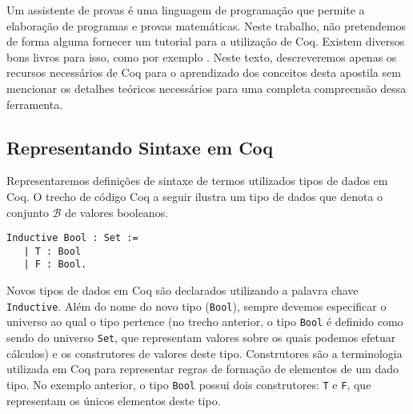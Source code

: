 Um assistente de provas \'e uma linguagem de programa\c{c}\~ao que permite a elabora\c{c}\~ao de programas e provas matem\'aticas.
Neste trabalho, n\~ao pretendemos de forma alguma fornecer um tutorial para a utiliza\c{c}\~ao de Coq. Existem diversos bons livros
para isso, como por exemplo \cite{coqart,Pierce12,Coqrefman}. Neste texto, descreveremos apenas os recursos necess\'arios de Coq para
o aprendizado dos conceitos desta apostila sem mencionar os detalhes te\'oricos necess\'arios para uma completa compreens\~ao dessa ferramenta.

\subsection{Representando Sintaxe em Coq}

Representaremos defini\c{c}\~oes de sintaxe de termos utilizados tipos de dados em Coq. O trecho de c\'odigo Coq a seguir ilustra um
tipo de dados que denota o conjunto $\mathcal{B}$ de valores booleanos.

\begin{lstlisting}
Inductive Bool : Set :=
   | T : Bool
   | F : Bool.
\end{lstlisting}

Novos tipos de dados em Coq s\~ao declarados utilizando a palavra chave \texttt{Inductive}. Al\'em do nome do novo tipo (\texttt{Bool}), sempre
devemos especificar o universo ao qual o tipo pertence (no trecho anterior, o tipo \texttt{Bool} \'e definido como sendo do universo 
\texttt{Set}, que representam valores sobre os quais podemos efetuar c\'alculos) e os construtores de valores deste tipo. Construtores s\~ao
a terminologia utilizada em Coq para representar regras de forma\c{c}\~ao de elementos de um dado tipo. No exemplo anterior, o tipo \texttt{Bool}
possui dois construtores: \texttt{T} e \texttt{F}, que representam os \'unicos elementos deste tipo.

